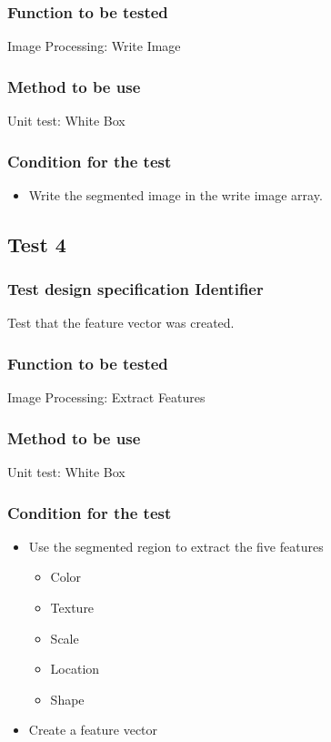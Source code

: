 \documentclass[12pt]{article}
\begin{document}
\subsubsection{Function to be tested}
Image Processing: Write Image
\subsubsection{Method to be use}
Unit test: White Box
\subsubsection{Condition for the test}
\begin{itemize}
\item Write the segmented image in the write image array.
    \end{itemize}
\subsection{Test 4}

\subsubsection{Test design specification Identifier}
Test that the feature vector was created.
\subsubsection{Function to be tested}
Image Processing: Extract Features
\subsubsection{Method to be use}
Unit test: White Box
\subsubsection{Condition for the test}
\begin{itemize}
\item Use the segmented region to extract the five features
    \begin{itemize}
    \item Color
    \item Texture
    \item Scale
    \item Location
    \item Shape
    \end{itemize}
    \item Create a feature vector
    \end{itemize}
\end{document}
